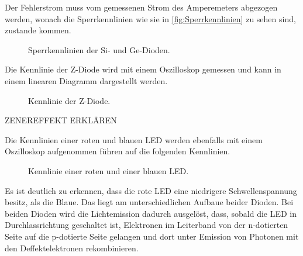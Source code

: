 \documentclass[
12pt,
a4paper,
bibliography=totocnumbered, %
BCOR=1cm, %
oneside, %
]{scrartcl}
\begin{document}
Der Fehlerstrom muss vom gemessenen Strom des Amperemeters abgezogen werden, wonach die Sperrkennlinien wie sie in \autoref{fig:Sperrkennlinien} zu sehen sind, zustande kommen.
\begin{figure}[H]
	\caption{Sperrkennlinien der Si- und Ge-Dioden.}
	\label{fig:Sperrkennlinien}
\end{figure}

Die Kennlinie der Z-Diode wird mit einem Oszilloskop gemessen und kann in einem linearen Diagramm dargestellt werden.
\begin{figure}[H]
	\caption{Kennlinie der Z-Diode.}
	\label{fig:KennlinieZ}
\end{figure}

ZENEREFFEKT ERKLÄREN

Die Kennlinien einer roten und blauen LED werden ebenfalls mit einem Oszilloskop aufgenommen führen auf die folgenden Kennlinien.
\begin{figure}[H]
	\caption{Kennlinie einer roten und einer blauen LED.}
	\label{fig:KennlinieLED}
\end{figure}

Es ist deutlich zu erkennen, dass die rote LED eine niedrigere Schwellenspannung besitz, als die Blaue. Das liegt am unterschiedlichen Aufbaue beider Dioden. Bei beiden Dioden wird die Lichtemission dadurch ausgelöst, dass, sobald die LED in Durchlassrichtung geschaltet ist, Elektronen im Leiterband von der n-dotierten Seite auf die p-dotierte Seite gelangen und dort unter Emission von Photonen mit den Deffektelektronen rekombinieren.
\end{document}
